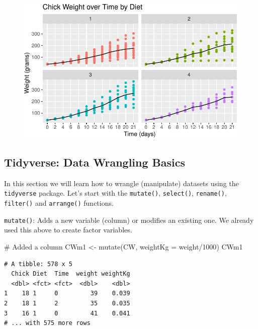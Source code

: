 \documentclass[
  letterpaper,
  DIV=11,
  numbers=noendperiod]{scrreprt}
\newenvironment{Shaded}{\begin{snugshade}}{\end{snugshade}}
\newcommand{\AttributeTok}[1]{\textcolor[rgb]{0.40,0.45,0.13}{#1}}
\newcommand{\CommentTok}[1]{\textcolor[rgb]{0.37,0.37,0.37}{#1}}
\newcommand{\DecValTok}[1]{\textcolor[rgb]{0.68,0.00,0.00}{#1}}
\newcommand{\FunctionTok}[1]{\textcolor[rgb]{0.28,0.35,0.67}{#1}}
\newcommand{\NormalTok}[1]{\textcolor[rgb]{0.00,0.23,0.31}{#1}}
\newcommand{\OtherTok}[1]{\textcolor[rgb]{0.00,0.23,0.31}{#1}}
\newcommand{\SpecialCharTok}[1]{\textcolor[rgb]{0.37,0.37,0.37}{#1}}
\theoremstyle{definition}
\theoremstyle{plain}
\theoremstyle{plain}
\theoremstyle{remark}
\begin{document}
\begin{figure}[H]

{\centering \includegraphics{./01-Introduction-to-R_files/figure-pdf/finalPlot-1.pdf}

}

\end{figure}

\hypertarget{tidyverse-data-wrangling-basics}{%
\subsection{Tidyverse: Data Wrangling
Basics}\label{tidyverse-data-wrangling-basics}}

In this section we will learn how to wrangle (manipulate) datasets using
the \texttt{tidyverse} package. Let's start with the \texttt{mutate()},
\texttt{select()}, \texttt{rename()}, \texttt{filter()} and
\texttt{arrange()} functions.

\hfill\break

\texttt{mutate()}: Adds a new variable (column) or modifies an existing
one. We already used this above to create factor variables.

\begin{Shaded}
\begin{Highlighting}[]
\CommentTok{\# Added a column}
\NormalTok{CWm1 }\OtherTok{\textless{}{-}} \FunctionTok{mutate}\NormalTok{(CW, }\AttributeTok{weightKg =}\NormalTok{ weight}\SpecialCharTok{/}\DecValTok{1000}\NormalTok{)}
\NormalTok{CWm1}
\end{Highlighting}
\end{Shaded}

\begin{verbatim}
# A tibble: 578 x 5
  Chick Diet  Time  weight weightKg
  <dbl> <fct> <fct>  <dbl>    <dbl>
1    18 1     0         39    0.039
2    18 1     2         35    0.035
3    16 1     0         41    0.041
# ... with 575 more rows
\end{verbatim}
\end{document}
